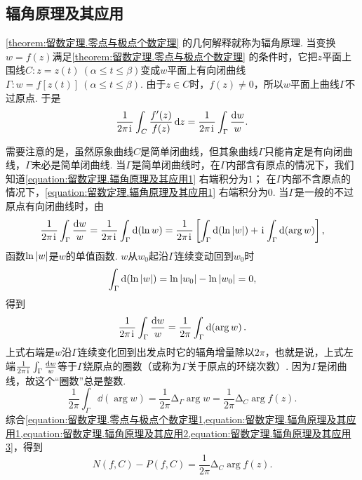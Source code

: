 \subsection{辐角原理及其应用}
\cref{theorem:留数定理.零点与极点个数定理} 的几何解释就称为辐角原理.
当变换\(w = f(z)\)满足\cref{theorem:留数定理.零点与极点个数定理} 的条件时，它把\(z\)平面上围线\(C: z = z(t)\ (\alpha \leq t \leq \beta)\)变成\(w\)平面上有向闭曲线\(\Gamma: w = f[z(t)]\ (\alpha \leq t \leq \beta)\).
由于\(z \in C\)时，\(f(z)\neq0\)，所以\(w\)平面上曲线\(\Gamma\)不过原点.
于是\begin{equation}\label{equation:留数定理.辐角原理及其应用1}
\frac{1}{2\pi\kern1pt\mathrm{i}\kern1pt} \int_C \frac{f'(z)}{f(z)} \dd{z}
= \frac{1}{2\pi\kern1pt\mathrm{i}\kern1pt} \int_{\Gamma} \frac{\dd{w}}{w}.
\end{equation}

需要注意的是，虽然原象曲线\(C\)是简单闭曲线，但其象曲线\(\Gamma\)只能肯定是有向闭曲线，\(\Gamma\)未必是简单闭曲线.
当\(\Gamma\)是简单闭曲线时，在\(\Gamma\)内部含有原点的情况下，我们知道\cref{equation:留数定理.辐角原理及其应用1} 右端积分为\(1\)；
在\(\Gamma\)内部不含原点的情况下，\cref{equation:留数定理.辐角原理及其应用1} 右端积分为\(0\).
当\(\Gamma\)是一般的不过原点有向闭曲线时，由\[
\frac{1}{2\pi\kern1pt\mathrm{i}\kern1pt} \int_{\Gamma} \frac{\dd{w}}{w}
= \frac{1}{2\pi\kern1pt\mathrm{i}\kern1pt} \int_{\Gamma} \dd(\ln w)
= \frac{1}{2\pi\kern1pt\mathrm{i}\kern1pt} \left[ \int_{\Gamma} \dd(\ln\abs{w}) + \kern1pt\mathrm{i}\kern1pt \int_{\Gamma} \dd(\arg w) \right],
\]函数\(\ln\abs{w}\)是\(w\)的单值函数.
\(w\)从\(w_0\)起沿\(\Gamma\)连续变动回到\(w_0\)时\[
\int_{\Gamma} \dd(\ln\abs{w})
= \ln\abs{w_0} - \ln\abs{w_0} = 0,
\]得到\begin{equation}\label{equation:留数定理.辐角原理及其应用2}
\frac{1}{2\pi\kern1pt\mathrm{i}\kern1pt} \int_{\Gamma} \frac{\dd{w}}{w}
= \frac{1}{2\pi} \int_{\Gamma} \dd(\arg w).
\end{equation}
上式右端是\(w\)沿\(\Gamma\)连续变化回到出发点时它的辐角增量除以\(2\pi\)，也就是说，上式左端\(\frac{1}{2\pi\kern1pt\mathrm{i}\kern1pt} \int_{\Gamma} \frac{\dd{w}}{w}\)等于\(\Gamma\)绕原点的圈数（或称为\(\Gamma\)关于原点的环绕次数）.
因为\(\Gamma\)是闭曲线，故这个“圈数”总是整数.
\begin{equation}\label{equation:留数定理.辐角原理及其应用3}
\frac{1}{2\pi} \int_{\Gamma} \dd(\arg w)
= \frac{1}{2\pi} \increment_{\Gamma} \arg w
= \frac{1}{2\pi} \increment_C \arg f(z).
\end{equation}
综合\cref{equation:留数定理.零点与极点个数定理1,equation:留数定理.辐角原理及其应用1,equation:留数定理.辐角原理及其应用2,equation:留数定理.辐角原理及其应用3}，得到\begin{equation}\label{equation:留数定理.辐角原理及其应用4}
N(f,C)-P(f,C) = \frac{1}{2\pi} \increment_C \arg f(z).
\end{equation}

